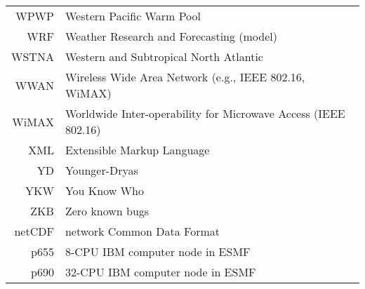 \documentclass[12pt,twoside]{article}
\begin{document}
\begin{longtable}[>{\bfseries}l]{>{\ttfamily}r l}
WPWP & Western Pacific Warm Pool \\
WRF & Weather Research and Forecasting (model) \\
WSTNA & Western and Subtropical North Atlantic \\
WWAN & Wireless Wide Area Network (e.g., IEEE 802.16, WiMAX) \\
WiMAX & Worldwide Inter-operability for Microwave Access (IEEE 802.16) \\
XML & Extensible Markup Language \\
YD & Younger-Dryas \\
YKW & You Know Who \\
ZKB & Zero known bugs \\
netCDF & network Common Data Format \\
p655 & 8-CPU IBM computer node in ESMF \\
p690 & 32-CPU IBM computer node in ESMF \\
\end{longtable}
\end{document}
